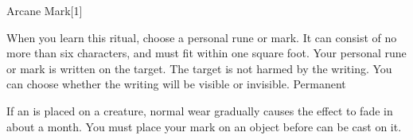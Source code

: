\begin{spellsection}{Arcane Mark}[1]
    \begin{spellheader}
    \end{spellheader}
    \begin{spellcontent}
        \begin{spelltargetinginfo}
            \spellrng{\rngtouch}
        \end{spelltargetinginfo}
        \begin{spelleffects}

            \spellspecial When you learn this ritual, choose a personal rune or mark. It can consist of no more than six characters, and must fit within one square foot.
            \spelleffect Your personal rune or mark is written on the target. The target is not harmed by the writing. You can choose whether the writing will be visible or invisible.
            \spelldur Permanent
        \end{spelleffects}
    \end{spellcontent}
    \begin{spellfooter}
        \spellnotes If an  is placed on a creature, normal wear gradually causes the effect to fade in about a month. You must place your mark on an object before  can be cast on it.
    \end{spellfooter}
\end{spellsection}

